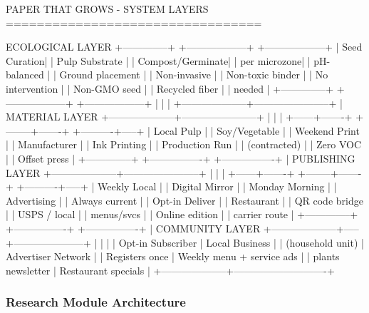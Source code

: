 \documentclass[11pt,letterpaper]{article}
\begin{document}
\begin{asciibox}
PAPER THAT GROWS - SYSTEM LAYERS
=================================

  ECOLOGICAL LAYER
  +--------------+    +------------------+    +------------------+
  | Seed Curation|    | Pulp Substrate   |    | Compost/Germinate|
  | per microzone|    | pH-balanced      |    | Ground placement |
  | Non-invasive |    | Non-toxic binder |    | No intervention  |
  | Non-GMO seed |    | Recycled fiber   |    | needed           |
  +--------------+    +------------------+    +------------------+
         |                    |                       |
         +--------------------+-----------------------+
                              |
                      MATERIAL LAYER
         +--------------------+-----------------------+
         |                    |                       |
  +------+-------+   +--------+-------+   +----------+-----+
  | Local Pulp   |   | Soy/Vegetable  |   | Weekend Print  |
  | Manufacturer |   | Ink Printing   |   | Production Run |
  | (contracted) |   | Zero VOC       |   | Offset press   |
  +--------------+   +----------------+   +----------------+
                              |
                     PUBLISHING LAYER
         +--------------------+-----------------------+
         |                    |                       |
  +------+-------+   +--------+-------+   +----------+-----+
  | Weekly Local |   | Digital Mirror |   | Monday Morning |
  | Advertising  |   | Always current |   | Opt-in Deliver |
  | Restaurant   |   | QR code bridge |   | USPS / local   |
  | menus/svcs   |   | Online edition |   | carrier route  |
  +--------------+   +----------------+   +----------------+
                              |
                     COMMUNITY LAYER
  +--------------------+-----+---------------------+
  |                    |                            |
  | Opt-in Subscriber  | Local Business             |
  | (household unit)   | Advertiser Network         |
  | Registers once     | Weekly menu + service ads  |
  | plants newsletter  | Restaurant specials        |
  +--------------------+----------------------------+
\end{asciibox}

\subsubsection{Research Module Architecture}
\end{document}
